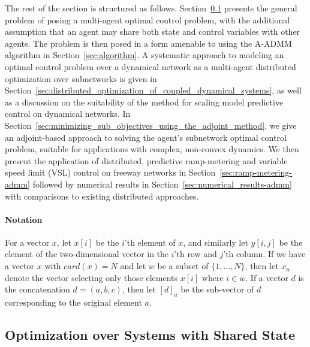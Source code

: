 The rest of the section is structured as follows. Section~\ref{sec:problem_statement} presents the general problem of posing a multi-agent optimal control problem, with the additional assumption that an agent may share both state and control variables with other agents. The problem is then posed in a form amenable to using the A-ADMM algorithm in Section~\ref{sec:algorithm}. A systematic approach to modeling an optimal control problem over a dynamical network as a multi-agent distributed optimization over subnetworks is given in Section~\ref{sec:distributed_optimization_of_coupled_dynamical_systems}, as well as a discussion on the suitability of the method for scaling model predictive control on dynamical networks. In Section~\ref{sec:minimizing_sub_objectives_using_the_adjoint_method}, we give an adjoint-based approach to solving the agent's subnetwork optimal control problem, suitable for applications with complex, non-convex dynamics. We then present the application of distributed, predictive ramp-metering and variable speed limit (VSL) control on freeway networks in Section~\ref{sec:ramp-metering-admm} followed by numerical results in Section~\ref{sec:numerical_results-admm} with comparisons to existing distributed approaches.

\paragraph*{\textbf{Notation}}

For a vector $x$, let $x\left[i\right]$ be the $i$'th element of $x$, and similarly let $y\left[i,j\right]$ be the element of the two-dimensional vector in the $i$'th row and $j$'th column. If we have a vector $x$ with $card\left(x\right)=N$ and let $w$ be a subset of $ \{1,\ldots,N\}$, then let $x_w$ denote the vector selecting only those elements $x\left[i\right]$ where $i\in w$. If a vector $d$ is the concatenation $d = \left(a,b,c\right)$, then let $\left[d\right]_a$ be the sub-vector of $d$ corresponding to the original element $a$.


\subsection{Optimization over Systems with Shared State}
\label{sec:problem_statement}

